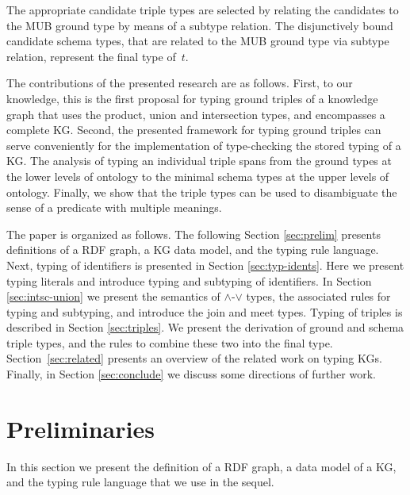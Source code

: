 \documentclass[runningheads]{llncs}
\begin{document}
The appropriate candidate triple types are selected by relating the
candidates to the MUB ground type by means of a subtype relation. The
disjunctively bound candidate schema types, that are related to the
MUB ground type via subtype relation, represent the final type of~$t$.


The contributions of the presented research are as follows. First, to
our knowledge, this is the first proposal for typing ground triples of
a knowledge graph that uses the product, union and intersection types,
and encompasses a complete KG. Second, the presented framework for
typing ground triples can serve conveniently for the implementation of
type-checking the stored typing of a KG. The analysis of typing an
individual triple spans from the ground types at the lower levels of
ontology to the minimal schema types at the upper levels of
ontology. Finally, we show that the triple types can be used to
disambiguate the sense of a predicate with multiple meanings.

The paper is organized as follows. The following Section
\ref{sec:prelim} presents definitions of a RDF graph, a KG data model,
and the typing rule language. Next, typing of identifiers is presented
in Section \ref{sec:typ-idents}. Here we present typing literals and
introduce typing and subtyping of identifiers. In Section
\ref{sec:intsc-union} we present the semantics of $\land$-$\lor$
types, the associated rules for typing and subtyping, and introduce
the join and meet types. Typing of triples is described in Section
\ref{sec:triples}. We present the derivation of ground and schema
triple types, and the rules to combine these two into the final
type. Section~\ref{sec:related} presents an overview of the related
work on typing KGs. Finally, in Section \ref{sec:conclude} we discuss
some directions of further work. 






\section{Preliminaries\label{sec:prelim}}

In this section we present the definition of a RDF graph, a data model
of a KG, and the typing rule language that we use in the sequel.
\end{document}
